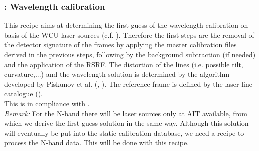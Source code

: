 \clearpage
\subsubsection{:  Wavelength calibration}\label{rec:metis_lm_lss_wave}
This recipe aims at determining the first guess of the wavelength calibration on basis of the \ac{WCU} laser sources (c.f. \cite{METIS-calibration_plan}). Therefore the first steps are the removal of the detector signature of the  frames by applying the master calibration files derived in the previous steps, following by the background subtraction (if needed) and the application of the RSRF. The distortion of the lines (i.e. possible tilt, curvature,...) and the wavelength solution is determined by the algorithm developed by Piskunov et al. (\cite{pis02}, \cite{pis21}). The reference frame is defined by the laser line catalogue ().\\
This is in compliance with .\\
\textit{Remark:}  For the N-band there will be laser sources only at \ac{AIT} available, from which we derive the first guess solution in the same way. Although this solution will eventually be put into the static calibration database, we need a recipe to process the N-band data. This will be done with this recipe.

